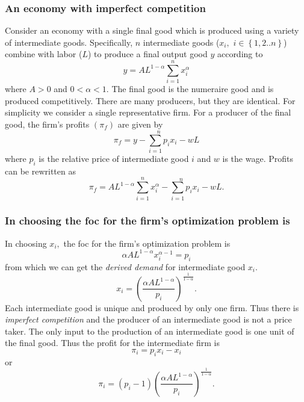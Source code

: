 \documentclass[aspectratio=169]{ltx-talk}
\begin{document}
\begin{frame}
\frametitle{An economy with imperfect competition}
Consider an economy with a single final good which is produced using a
variety of intermediate goods. Specifically, $n$ intermediate goods ($x_{i},$
$i\in \left\{ 1,2..n\right\} $) combine with labor ($L$) to produce a final
output good $y$ according to 
\begin{equation*}
y=AL^{1-\alpha }\overset{n}{\underset{i=1}{\sum }}x_{i}^{\alpha }
\end{equation*}%
where $A>0$ and $0<\alpha <1.$ The final good is the numeraire good and is
produced competitively. There are many producers, but they are identical.
For simplicity we consider a single representative firm. For a producer of
the final good, the firm's profits $\left( \pi _{f}\right) $ are given by 
\begin{equation*}
\pi _{f}=y-\overset{n}{\underset{i=1}{\sum }p_{i}}x_{i}-wL
\end{equation*}%
where $p_{i}$ is the relative price of intermediate good $i$ and $w$ is the
wage. Profits can be rewritten as%
\begin{equation*}
\pi _{f}=AL^{1-\alpha }\overset{n}{\underset{i=1}{\sum }}x_{i}^{\alpha }-%
\overset{n}{\underset{i=1}{\sum }p_{i}}x_{i}-wL.
\end{equation*}%
\end{frame}

\begin{frame}
\frametitle{In choosing the foc for the firm{'}s optimization problem is}
In choosing $x_{i},$ the foc for the firm's optimization problem is%
\begin{equation*}
\alpha AL^{1-\alpha }x_{i}^{\alpha -1}=p_{i}
\end{equation*}%
from which we can get the \textit{derived demand} for intermediate good $%
x_{i}.$ 
\begin{equation*}
x_{i}=\left( \frac{\alpha AL^{1-\alpha }}{p_{i}}\right) ^{\frac{1}{1-\alpha }%
}.
\end{equation*}%
Each intermediate good is unique and produced by only one firm. Thus there
is \textit{imperfect competition} and the producer of an intermediate good
is not a price taker. The only input to the production of an intermediate
good is one unit of the final good. Thus the profit for the intermediate
firm is 
\begin{equation*}
\pi _{i}=p_{i}x_{i}-x_{i}
\end{equation*}%
or 
\begin{equation*}
\pi _{i}=\left( p_{i}-1\right) \left( \frac{\alpha AL^{1-\alpha }}{p_{i}}%
\right) ^{\frac{1}{1-\alpha }}.
\end{equation*}
\end{frame}
\end{document}

